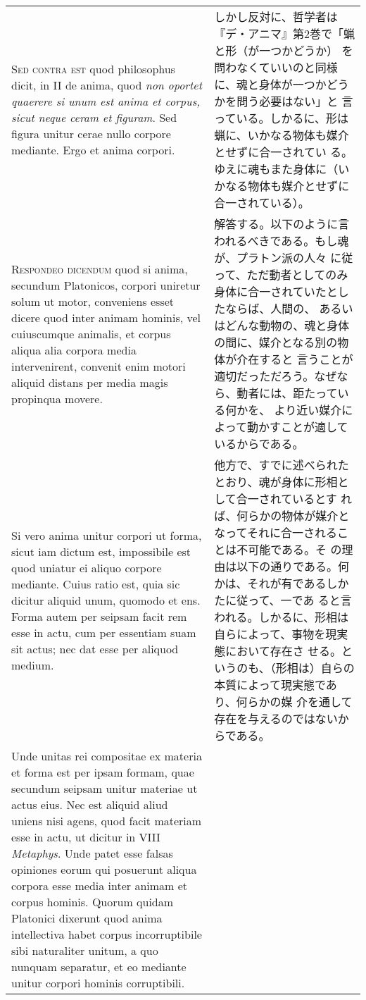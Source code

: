 \documentclass[paper=a4paper,fontsize=10pt,jafontsize=9pt,titlepage]{jlreq}
\begin{document}
\begin{longtable}{p{21em}p{21em}}
{\scshape Sed contra est} quod philosophus dicit, in II de anima, quod
{\itshape non oportet quaerere si unum est anima et corpus, sicut
neque ceram et figuram}. Sed figura unitur cerae nullo corpore
mediante. Ergo et anima corpori.

&

しかし反対に、哲学者は『デ・アニマ』第2巻で「蝋と形（が一つかどうか）
を問わなくていいのと同様に、魂と身体が一つかどうかを問う必要はない」と
言っている。しかるに、形は蝋に、いかなる物体も媒介とせずに合一されてい
る。ゆえに魂もまた身体に（いかなる物体も媒介とせずに合一されている）。

\\



 {\scshape Respondeo dicendum} quod si anima, secundum Platonicos,
 corpori uniretur solum ut motor, conveniens esset dicere quod inter
 animam hominis, vel cuiuscumque animalis, et corpus aliqua alia
 corpora media intervenirent, convenit enim motori aliquid distans per
 media magis propinqua movere.

&

 解答する。以下のように言われるべきである。もし魂が、プラトン派の人々
 に従って、ただ動者としてのみ身体に合一されていたとしたならば、人間の、
 あるいはどんな動物の、魂と身体の間に、媒介となる別の物体が介在すると
 言うことが適切だっただろう。なぜなら、動者には、距たっている何かを、
 より近い媒介によって動かすことが適しているからである。

\\



 Si vero anima unitur corpori ut forma, sicut iam dictum est,
 impossibile est quod uniatur ei aliquo corpore mediante. Cuius ratio
 est, quia sic dicitur aliquid unum, quomodo et ens. Forma autem per
 seipsam facit rem esse in actu, cum per essentiam suam sit actus; nec
 dat esse per aliquod medium.

&

他方で、すでに述べられたとおり、魂が身体に形相として合一されているとす
れば、何らかの物体が媒介となってそれに合一されることは不可能である。そ
の理由は以下の通りである。何かは、それが有であるしかたに従って、一であ
ると言われる。しかるに、形相は自らによって、事物を現実態において存在さ
せる。というのも、（形相は）自らの本質によって現実態であり、何らかの媒
介を通して存在を与えるのではないからである。

\\

 Unde unitas rei compositae ex materia et forma est per ipsam formam,
 quae secundum seipsam unitur materiae ut actus eius. Nec est aliquid
 aliud uniens nisi agens, quod facit materiam esse in actu, ut dicitur
 in VIII {\itshape Metaphys}. Unde patet esse falsas opiniones eorum
 qui posuerunt aliqua corpora esse media inter animam et corpus
 hominis. Quorum quidam Platonici dixerunt quod anima intellectiva
 habet corpus incorruptibile sibi naturaliter unitum, a quo nunquam
 separatur, et eo mediante unitur corpori hominis corruptibili.


\end{longtable}
\end{document}
